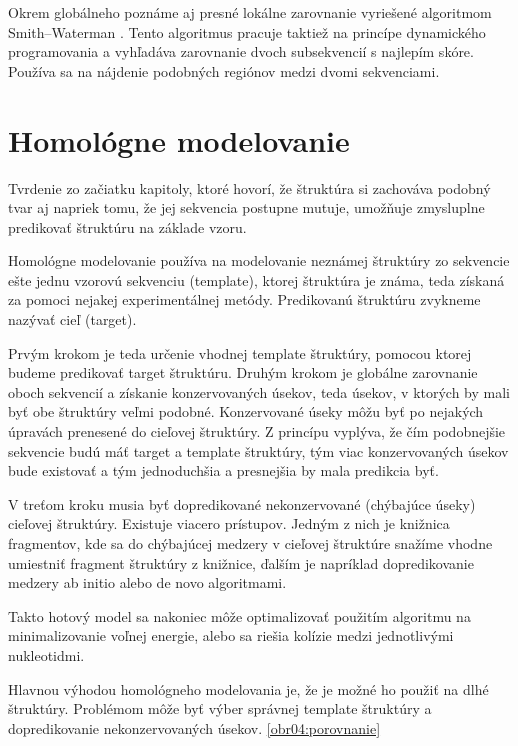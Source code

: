 \indent Okrem globálneho poznáme aj presné lokálne zarovnanie vyriešené algoritmom Smith–Waterman \cite{Smith81}. Tento algoritmus pracuje taktiež na princípe dynamického programovania a vyhľadáva zarovnanie dvoch subsekvencií s najlepím skóre. Používa sa na nájdenie podobných regiónov medzi dvomi sekvenciami.


\section{Homológne modelovanie}
Tvrdenie zo začiatku kapitoly, ktoré hovorí, že štruktúra si zachováva podobný tvar aj napriek tomu, že jej sekvencia postupne mutuje, umožňuje zmysluplne predikovať štruktúru na základe vzoru.  


\indent Homológne modelovanie používa na modelovanie neznámej štruktúry zo sekvencie ešte jednu vzorovú sekvenciu (template), ktorej štruktúra je známa, teda získaná za pomoci nejakej experimentálnej metódy. Predikovanú štruktúru zvykneme nazývať cieľ (target).


\indent Prvým krokom je teda určenie vhodnej template štruktúry, pomocou ktorej budeme predikovať target štruktúru. Druhým krokom je globálne zarovnanie oboch sekvencií a získanie konzervovaných úsekov, teda úsekov, v ktorých by mali byť obe štruktúry veľmi podobné. Konzervované úseky môžu byť po nejakých úpravách prenesené do cieľovej štruktúry. Z princípu vyplýva, že čím podobnejšie sekvencie budú máť target a template štruktúry, tým viac konzervovaných úsekov bude existovať a tým jednoduchšia a presnejšia by mala predikcia byť.


\indent V treťom kroku musia byť dopredikované nekonzervované (chýbajúce úseky) cieľovej štruktúry. Existuje viacero prístupov. Jedným z nich je knižnica fragmentov, kde sa do chýbajúcej medzery v cieľovej štruktúre snažíme vhodne umiestniť fragment štruktúry z knižnice, ďalším je napríklad dopredikovanie medzery ab initio alebo de novo algoritmami.


\indent Takto hotový model sa nakoniec môže optimalizovať použitím algoritmu na minimalizovanie voľnej energie, alebo sa riešia kolízie medzi jednotlivými nukleotidmi.


\indent Hlavnou výhodou homológneho modelovania je, že je možné ho použiť na dlhé štruktúry. Problémom môže byť výber správnej template štruktúry a dopredikovanie nekonzervovaných úsekov. \ref{obr04:porovnanie}


